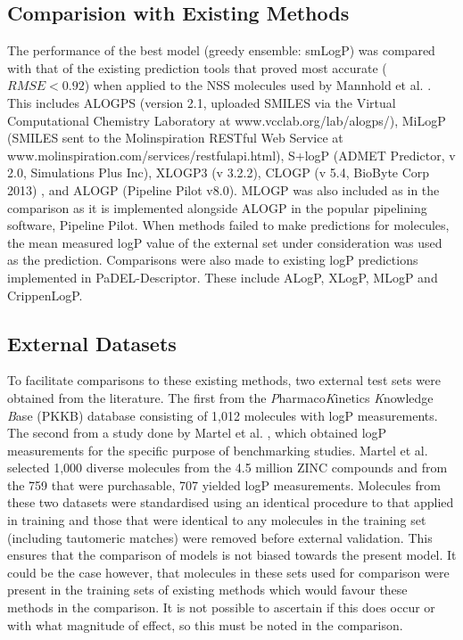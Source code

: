 \documentclass[10pt]{bmc_article}
\newenvironment{bmcformat}{\begin{raggedright}\baselineskip20pt\sloppy\setboolean{publ}{false}}{\end{raggedright}\baselineskip20pt\sloppy}
\begin{document}
\begin{bmcformat}
\subsection*{Comparision with Existing Methods}  

The performance of the best model (greedy ensemble: smLogP) was compared with that of the existing prediction tools that proved most accurate ($RMSE < 0.92$) when applied to the NSS molecules used by Mannhold et al. \cite{mannhold_calculation_2009}. This includes ALOGPS \cite{tetko_application_2004} (version 2.1, uploaded SMILES via the Virtual Computational Chemistry Laboratory at www.vcclab.org/lab/alogps/), MiLogP \cite{_molinspiratoin_2013} (SMILES sent to the Molinspiration RESTful Web Service at www.molinspiration.com/services/restfulapi.html), S+logP (ADMET Predictor, v 2.0, Simulations Plus Inc), XLOGP3 \cite{cheng_computation_2007} (v 3.2.2), CLOGP (v 5.4, BioByte Corp 2013) \cite{leo_partition_1971, hansch_substituent_1979, leo_calculating_1993}, and ALOGP \cite{viswanadhan_atomic_1989} (Pipeline Pilot v8.0). MLOGP \cite{viswanadhan_atomic_1989} was also included as in the comparison as it is implemented alongside ALOGP in the popular pipelining software, Pipeline Pilot. When methods failed to make predictions for molecules, the mean measured logP value of the external set under consideration was used as the prediction. Comparisons were also made to existing logP predictions implemented in PaDEL-Descriptor. These include ALogP, XLogP, MLogP and CrippenLogP.

\subsection*{External Datasets}

To facilitate comparisons to these existing methods, two external test sets were obtained from the literature. The first from the \textit{P}harmaco\textit{K}inetics \textit{K}nowledge \textit{B}ase (PKKB) database \cite{cao_admet_2012} consisting of 1,012 molecules with logP measurements. The second from a study done by Martel et al. \cite{martel_large_2013}, which obtained logP measurements for the specific purpose of benchmarking studies. Martel et al. selected 1,000 diverse molecules from the 4.5 million ZINC \cite{irwin_zinc_2005} compounds and from the 759 that were purchasable, 707 yielded logP measurements. Molecules from these two datasets were standardised using an identical procedure to that applied in training and those that were identical to any molecules in the training set (including tautomeric matches) were removed before external validation. This ensures that the comparison of models is not biased towards the present model. It could be the case however, that molecules in these sets used for comparison were present in the training sets of existing methods which would favour these methods in the comparison. It is not possible to ascertain if this does occur or with what magnitude of effect, so this must be noted in the comparison.


\end{bmcformat}
\end{document}
